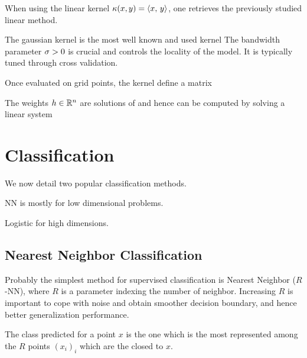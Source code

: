When using the linear kernel $\kappa(x,y)=\langle x,\,y\rangle$, one retrieves
the previously studied linear method. 



The gaussian kernel is the most well known and used kernel
The bandwidth parameter $\sigma>0$ is crucial and controls the locality of
the model. It is typically tuned through cross validation.  

Once evaluated on grid points, the kernel define a matrix

The weights $h \in \mathbb{R}^n $ are solutions of
and hence can be computed by solving a linear system







\section{Classification}

We now detail two popular classification methods.


NN is mostly for low dimensional problems.

Logistic for high dimensions.



\subsection{Nearest Neighbor Classification}

Probably the simplest method for supervised classification is Nearest
Neighbor ($R$-NN), where $R$ is a parameter indexing the number of neighbor.
Increasing $R$ is important to cope with noise and obtain smoother
decision boundary, and hence better generalization performance.

The class predicted for a point $x$ is the one which is the most
represented among the $R$ points $(x_i)_i$ which are the closed to
$x$.


